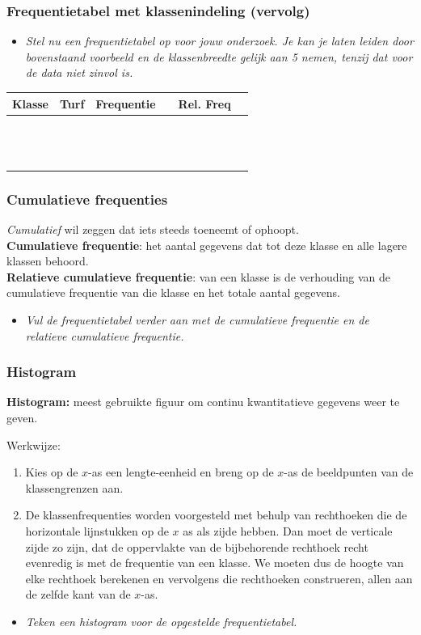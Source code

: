 \documentclass[dutch]{beamer}
\newcommand{\vraag}[1]{\begin{itemize}\item[Vraag:] {\it #1}\end{itemize}}
\begin{document}
\begin{frame}
\frametitle{Frequentietabel met klassenindeling (vervolg)}
\vraag{Stel nu een frequentietabel op voor jouw onderzoek. Je kan je laten leiden door bovenstaand
voorbeeld en de klassenbreedte gelijk aan 5 nemen, tenzij dat voor de data niet zinvol is.}
\begin{center}
  \begin{tabular}{|p{1.5cm}|p{1.5cm}|p{1.5cm}|p{1.5cm}|p{1.5cm}|p{1.5cm}|}
    \hline
    Klasse & Turf & Frequentie &&Rel. Freq&\\
    \hline&&&&&\\\hline&&&&&\\\hline&&&&&\\\hline&&&&&\\\hline&&&&&\\
    \hline&&&&&\\\hline&&&&&\\\hline&&&&&\\\hline&&&&&\\\hline&&&&&\\
    \hline&&&&&\\\hline&&&&&\\\hline&&&&&\\\hline
  \end{tabular}
\end{center}
\end{frame}

\begin{frame}
\frametitle{Cumulatieve frequenties}
{\it Cumulatief} wil zeggen dat iets steeds toeneemt of ophoopt.\\
\vspace*{0.5cm}
\pause
{\bf Cumulatieve frequentie}: het aantal gegevens dat tot deze klasse en alle lagere klassen behoord.\\
{\bf Relatieve cumulatieve frequentie}: van een klasse is de verhouding van de cumulatieve frequentie van die klasse en het totale aantal gegevens.
\pause
\vraag{Vul de frequentietabel verder aan met de cumulatieve frequentie en de relatieve cumulatieve frequentie.}
\end{frame}

\begin{frame}
\frametitle{Histogram}

{\bf Histogram:} meest gebruikte figuur om continu kwantitatieve gegevens weer te geven.

Werkwijze:
\begin{enumerate}
  \item Kies op de $x$-as een lengte-eenheid en breng op de $x$-as de beeldpunten van de klassengrenzen aan.
  \item De klassenfrequenties worden voorgesteld met behulp van rechthoeken die de horizontale lijnstukken op de $x$ as als zijde hebben. Dan moet de verticale zijde zo zijn, dat de oppervlakte van de bijbehorende rechthoek recht evenredig is met de frequentie van een klasse. We moeten dus de hoogte van elke rechthoek berekenen en vervolgens die rechthoeken construeren, allen aan de zelfde kant van de $x$-as.
\end{enumerate}
\pause
\vraag{Teken een histogram voor de opgestelde frequentietabel.}
\end{frame}
\end{document}
